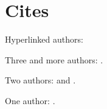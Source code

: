 \documentclass[english]{scrbook}
\begin{document}
\chapter{Cites}
Hyperlinked authors:

Three and more authors: \citeauthor{ABC01} \cite{ABC01}.

Two authors: \citeauthor{AB00} \cite{AB00} and \citeauthor{vdAW2013} \cite{vdAW2013}.

One author: \citeauthor{Ez10} \cite{Ez10}.

\nocite{*}
\printbibliography
\end{document}
